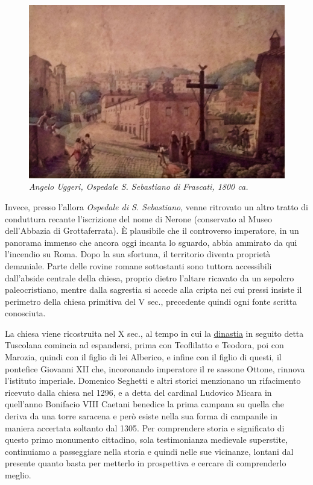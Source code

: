 \documentclass[
  letterpaper,
  DIV=11,
  numbers=noendperiod]{scrartcl}
\begin{document}
\begin{figure}

{\centering \includegraphics{../../images/2024/san_rocco/8largo-pentini.jpg}

}

\caption{\emph{Angelo Uggeri, Ospedale S. Sebastiano di Frascati, 1800
ca.}}

\end{figure}

Invece, presso l'allora \emph{Ospedale di S. Sebastiano}, venne
ritrovato un altro tratto di conduttura recante l'iscrizione del nome di
Nerone (conservato al Museo dell'Abbazia di Grottaferrata). È plausibile
che il controverso imperatore, in un panorama immenso che ancora oggi
incanta lo sguardo, abbia ammirato da qui l'incendio su Roma. Dopo la
sua sfortuna, il territorio diventa proprietà demaniale. Parte delle
rovine romane sottostanti sono tuttora accessibili dall'abside centrale
della chiesa, proprio dietro l'altare ricavato da un sepolcro
paleocristiano, mentre dalla sagrestia si accede alla cripta nei cui
pressi insiste il perimetro della chiesa primitiva del V sec.,
precedente quindi ogni fonte scritta conosciuta.

La chiesa viene ricostruita nel X sec., al tempo in cui la
\href{2012-05-10-possedimenti-memorie-tuscolo-comandini.html}{dinastia}
in seguito detta Tuscolana comincia ad espandersi, prima con Teoflilatto
e Teodora, poi con Marozia, quindi con il figlio di lei Alberico, e
infine con il figlio di questi, il pontefice Giovanni XII che,
incoronando imperatore il re sassone Ottone, rinnova l'istituto
imperiale. Domenico Seghetti e altri storici menzionano un rifacimento
ricevuto dalla chiesa nel 1296, e a detta del cardinal Ludovico Micara
in quell'anno Bonifacio VIII Caetani benedice la prima campana su quella
che deriva da una torre saracena e però esiste nella sua forma di
campanile in maniera accertata soltanto dal 1305. Per comprendere storia
e significato di questo primo monumento cittadino, sola testimonianza
medievale superstite, continuiamo a passeggiare nella storia e quindi
nelle sue vicinanze, lontani dal presente quanto basta per metterlo in
prospettiva e cercare di comprenderlo meglio.
\end{document}
